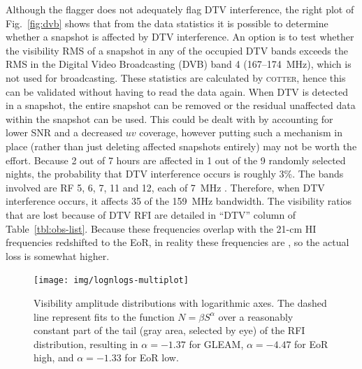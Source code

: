 \documentclass{pasa}
\newcommand{\editmark}[1]{{\color{red}{\textbf{#1}}}}
\begin{document}
Although the flagger does not adequately flag DTV interference, the right plot of Fig.~\ref{fig:dvb} shows that from the data statistics it is possible to determine whether a snapshot is affected by DTV interference. An option is to test whether the visibility RMS of a snapshot in any of the occupied DTV bands exceeds the RMS in the Digital Video Broadcasting (DVB) band 4 (167--174~MHz), which is not used for broadcasting. These statistics are calculated by \textsc{cotter}, hence this can be validated without having to read the data again. When DTV is detected in a snapshot, the entire snapshot can be removed or the residual unaffected data within the snapshot can be used. This could be dealt with by accounting for lower SNR and a decreased $uv$ coverage, however putting such a mechanism in place (rather than just deleting affected snapshots entirely) may not be worth the effort. Because 2 out of 7 hours are affected in 1 out of the 9 randomly selected nights, the probability that DTV interference occurs is roughly 3\%. The bands involved are RF 5, 6, 7, 11 and 12, each of 7~MHz \editmark{bandwidth}. Therefore, when DTV interference occurs, it affects 35 of the 159~MHz bandwidth. The visibility ratios that are lost because of DTV RFI are detailed in \editmark{the} ``DTV'' column of Table~\ref{tbl:obs-list}. Because these frequencies overlap with the 21-cm HI frequencies redshifted to the EoR, in reality these frequencies are \editmark{observed more often}, so the actual loss is somewhat higher.

\noindent\begin{figure}
\begin{center}\hspace*{-0.2cm}\texttt{[image: img/lognlogs-multiplot]}
\caption{Visibility amplitude distributions with logarithmic axes. The dashed line represent fits to the function $N=\beta S^\alpha$ over a reasonably constant part of the tail (gray area, selected by eye) of the RFI distribution, resulting in $\alpha=-1.37$ for GLEAM, $\alpha=-4.47$ for EoR high, and $\alpha=-1.33$ for EoR low.}
\label{fig:lognlogs}
\end{center}
\end{figure}
\end{document}
